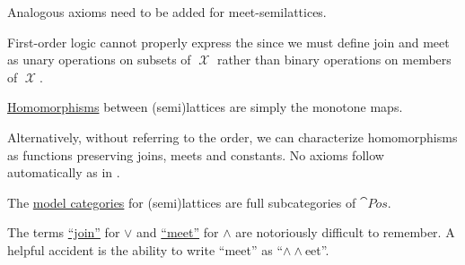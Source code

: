 \begin{definition}
\begin{thmenum}[resume=def:semilattice]
    Analogous axioms need to be added for meet-semilattices.

    First-order logic cannot properly express the  since we must define join and meet as unary operations on subsets of \( \mscrX \) rather than binary operations on members of \( \mscrX \).

     \hyperref[def:first_order_homomorphism]{Homomorphisms} between (semi)lattices are simply the monotone maps.

    Alternatively, without referring to the order, we can characterize homomorphisms as functions preserving joins, meets and constants. No axioms follow automatically as in .

     The \hyperref[def:category_of_first_order_models]{model categories} for (semi)lattices are full subcategories of \hyperref[def:poset/category]{\( \cat{Pos} \)}.
  \end{thmenum}
\end{definition}

\begin{remark}\label{rem:lattice_operation_etymology}
  The terms \hyperref[thm:binary_lattice_operations/join]{\enquote{join}} for \( \vee \) and \hyperref[thm:binary_lattice_operations/meet]{\enquote{meet}} for \( \wedge \) are notoriously difficult to remember. A helpful accident is the ability to write \enquote{meet} as \enquote{\( \wedge \wedge \)eet}.
\end{remark}

